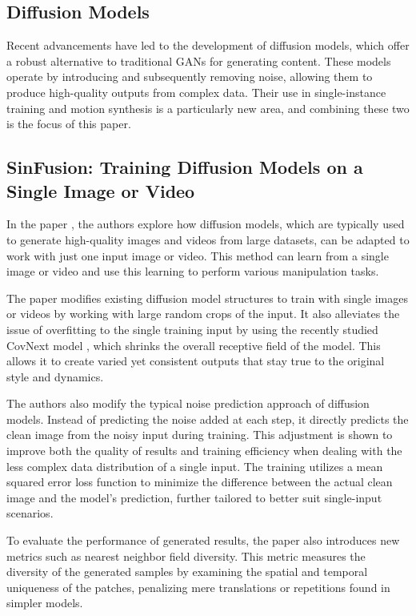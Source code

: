 \documentclass[a4paper, 12pt]{report}
\begin{document}
\subsection{Diffusion Models}
Recent advancements have led to the development of diffusion models, which offer a robust alternative to traditional GANs for generating content. These models operate by introducing and subsequently removing noise, allowing them to produce high-quality outputs from complex data. Their use in single-instance training and motion synthesis is a particularly new area, and combining these two is the focus of this paper.

\subsection{SinFusion: Training Diffusion Models on a Single Image or Video} 
In the paper \cite{nikankin_sinfusion_2023}, the authors explore how diffusion models, which are typically used to generate high-quality images and videos from large datasets, can be adapted to work with just one input image or video. This method can learn from a single image or video and use this learning to perform various manipulation tasks. 

The paper modifies existing diffusion model structures to train with single images or videos by working with large random crops of the input. It also alleviates the issue of overfitting to the single training input by using the recently studied CovNext model \cite{liu_convnet_2022}, which shrinks the overall receptive field \cite{araujo_computing_2019} of the model. This allows it to create varied yet consistent outputs that stay true to the original style and dynamics. 

The authors also modify the typical noise prediction approach of diffusion models. Instead of predicting the noise added at each step, it directly predicts the clean image from the noisy input during training. This adjustment is shown to improve both the quality of results and training efficiency when dealing with the less complex data distribution of a single input. The training utilizes a mean squared error loss function to minimize the difference between the actual clean image and the model's prediction, further tailored to better suit single-input scenarios.

To evaluate the performance of generated results, the paper also introduces new metrics such as nearest neighbor field diversity. This metric measures the diversity of the generated samples by examining the spatial and temporal uniqueness of the patches, penalizing mere translations or repetitions found in simpler models.
\end{document}
